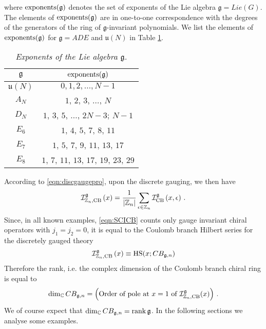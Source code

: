 \documentclass[main.tex]{subfiles}
\begin{document}
where $\operatorname{exponents}(\mathfrak{g})$ denotes the set of exponents of the Lie algebra $\mathfrak{g}=Lie(G)$. The elements of $\operatorname{exponents}(\mathfrak{g})$ are in one-to-one correspondence with the degrees of the generators of the ring of $\mathfrak{g}$-invariant polynomials. We list the elements of $\operatorname{exponents}(\mathfrak{g})$ for $\mathfrak{g}=ADE$ and $\mathfrak{u}(N)$ in Table \ref{tab:degrees}.
\begin{table}
\centering
\begin{tabular}{|c|c|} 
\hline
 $\mathfrak{g}$ & $\operatorname{exponents}(\mathfrak{g})$\\\hline 
 \hline
  $\mathfrak{u}(N)$&$0,1,2,\dots,N-1$\\\hline
 $A_{N}$&$1$, $2$, $3$, $\dots$, $N$\\\hline
 $D_{N}$&$1$, $3$, $5$, $\dots$, $2N-3$; $N-1$\\\hline
 $E_{6}$&$1$, $4$, $5$, $7$, $8$, $11$\\\hline
 $E_{7}$&$1$, $5$, $7$, $9$, $11$, $13$, $17$\\\hline
 $E_{8}$&$1$, $7$, $11$, $13$, $17$, $19$, $23$, $29$\\\hline
\end{tabular}
\caption{\it Exponents of the Lie algebra $\mathfrak{g}$.}
\label{tab:degrees}
\end{table}
According to \eqref{eqn:discgaugepro}, upon the discrete gauging, we then have
\begin{equation}\label{eqn:SCICB}
\mathcal{I}^{\mathfrak{g}}_{\mathbb{Z}_{n},\text{CB}}\left(x\right)= \frac{1}{|\mathbb{Z}_{n}|}\sum_{\epsilon\in\mathbb{Z}_{n}}\mathcal{I}^{\mathfrak{g}}_{\text{CB}}\left(x,\epsilon\right) \,.
\end{equation}
Since, in all known examples, \eqref{eqn:SCICB} counts only gauge invariant chiral operators with $j_1=j_2=0$, it is equal to the Coulomb branch Hilbert series for the discretely gauged theory
\begin{equation}
\mathcal{I}^{\mathfrak{g}}_{\mathbb{Z}_{n},\text{CB}}\left(x\right)\equiv\textrm{HS}(x;CB_{\mathfrak{g},n})
\end{equation}
 Therefore the rank, i.e. the complex dimension of the Coulomb branch chiral ring is equal to \cite{Cremonesi:2017jrk}
\begin{equation}\label{eqn:CBdim}
\dim_{\mathbb{C}}CB_{\mathfrak{g},n}=\left(\text{Order of pole at $x=1$ of $\mathcal{I}_{\mathbb{Z}_{n},\text{CB}}^{\mathfrak{g}}(x)$}\right)\,.
\end{equation} 
We of course expect that $\dim_{\mathbb{C}}CB_{\mathfrak{g},n}=\operatorname{rank}\mathfrak{g}$. In the following sections we analyse some examples. 
\end{document}
